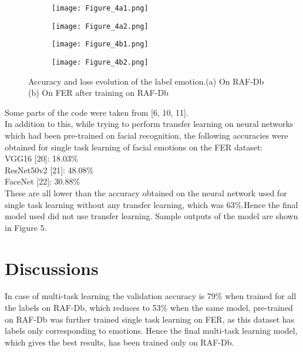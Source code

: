 \documentclass[letterpaper,10pt]{article}
\begin{document}
\begin{figure}
     \centering
     \begin{subfigure}[b]{0.5\textwidth}
         \centering
         \texttt{[image: Figure\_4a1.png]}
         
         
     \end{subfigure}
     \begin{subfigure}[b]{0.5\textwidth}
         \centering
         \texttt{[image: Figure\_4a2.png]}
         
       \caption{} 
     \end{subfigure}
     \begin{subfigure}[b]{0.5\textwidth}
         \centering
         \texttt{[image: Figure\_4b1.png]}
         
         
     \end{subfigure}
     \begin{subfigure}[b]{0.5\textwidth}
         \centering
         \texttt{[image: Figure\_4b2.png]}
         
        \caption{}
     \end{subfigure}
        \caption{ Accuracy and loss evolution of the label emotion.(a) On RAF-Db (b) On FER after training on RAF-Db}


       
\end{figure}
Some parts of the code were taken from [6, 10, 11].\\
In addition to this, while trying to perform transfer learning on neural networks which had been pre-trained on facial recognition, the following accuracies were obtained for single task learning of facial emotions on the FER dataset:\\
VGG16 [20]: 18.03\%\\
ResNet50v2 [21]: 48.08\%\\
FaceNet [22]: 30.88\%\\
These are all lower than the accuracy obtained on the neural network used for single task learning without any transfer learning, which was 63\%.Hence the final model used did not use transfer learning.
Sample outputs of the model are shown in Figure 5.



\section{Discussions}
In case of multi-task learning the validation accuracy is 79\% when trained for all the labels on RAF-Db, which reduces to 53\% when the same model, pre-trained on RAF-Db was further trained single task learning on FER, as this dataset has labels only corresponding to emotions.
Hence the final multi-task learning model, which gives the best results, has been trained only on RAF-Db.
\end{document}
